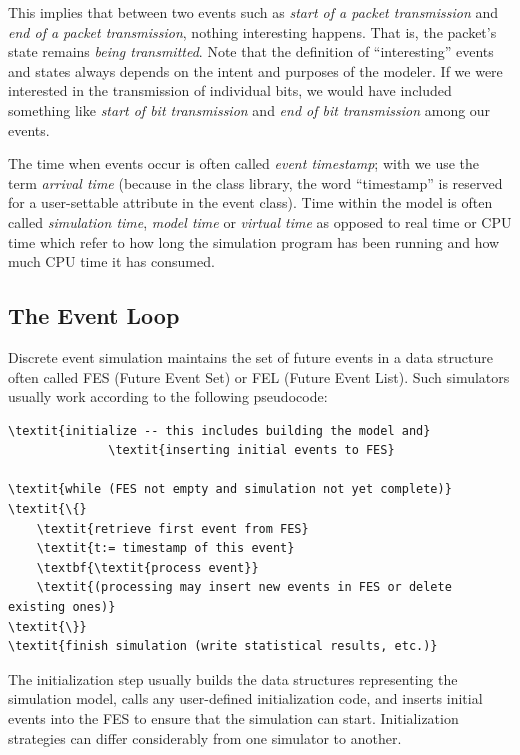 This implies that between two events such as \textit{start of a packet
transmission} and \textit{end of a packet transmission}, nothing
interesting happens. That is, the packet's state remains \textit{being
transmitted}. Note that the definition of ``interesting'' events and states always
depends on the intent and purposes of the modeler.
If we were interested in the transmission of individual bits, we would
have included something like \textit{start of bit transmission} and
\textit{end of bit transmission} among our events.


The time when events occur is often called \textit{event timestamp};
 with {\opp} we use the term
\textit{arrival time} (because in the class
library, the word ``timestamp'' is reserved for a user-settable
attribute in the event class). Time within the model is often called
\textit{simulation time}, \textit{model time}
 or \textit{virtual time}
as opposed to real time or CPU time
which refer to how long the simulation program has been running and
how much CPU time it has consumed.



\subsection{The Event Loop}
\label{sec:simple-modules:event-loop}

Discrete event simulation maintains the set of future
events in a data structure often called
FES (Future Event Set) or FEL (Future Event List).
Such simulators usually work according to the following pseudocode:

\begin{Verbatim}[commandchars=\\\{\}]
\textit{initialize -- this includes building the model and}
              \textit{inserting initial events to FES}

\textit{while (FES not empty and simulation not yet complete)}
\textit{\{}
    \textit{retrieve first event from FES}
    \textit{t:= timestamp of this event}
    \textbf{\textit{process event}}
    \textit{(processing may insert new events in FES or delete existing ones)}
\textit{\}}
\textit{finish simulation (write statistical results, etc.)}
\end{Verbatim}


The initialization step usually builds the data structures
representing the simulation model, calls any user-defined
initialization code, and inserts initial events
into the FES to ensure that the simulation can start. Initialization
strategies can differ considerably from one simulator to another.


